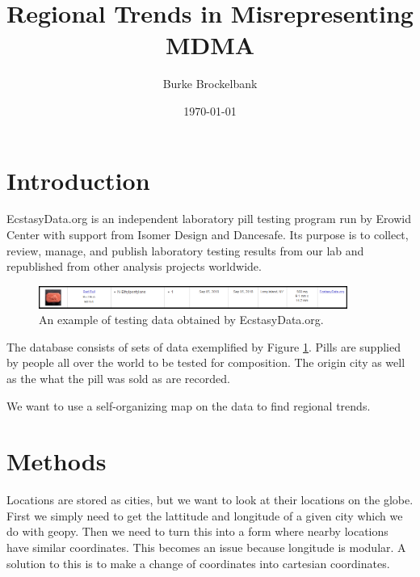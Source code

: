 \documentclass[%
 reprint,
nofootinbib,
 amsmath,amssymb,
 aps,
]{revtex4-1}
\begin{document}

\title{Regional Trends in Misrepresenting MDMA}%

\author{Burke Brockelbank}

\date{\today}%

\begin{abstract}

\end{abstract}

\maketitle

\section{\label{sec:Introduction}Introduction}
EcstasyData.org is an independent laboratory pill testing program run by Erowid Center with support from Isomer Design and Dancesafe. Its purpose is to collect, review, manage, and publish laboratory testing results from our lab and republished from other analysis projects worldwide.

\begin{figure}
  \includegraphics[width=0.9\textwidth]{example.png}
  \caption{An example of testing data obtained by EcstasyData.org. } \label{fig:DataExample}
\end{figure}

The database consists of sets of data exemplified by Figure \ref{fig:DataExample}. Pills are supplied by people all over the world to be tested for composition. The origin city as well as the what the pill was sold as are recorded.

We want to use a self-organizing map on the data to find regional trends.

\section{\label{sec:Methods}Methods}

	Locations are stored as cities, but we want to look at their locations on the globe. First we simply need to get the lattitude and longitude of a given city which we do with geopy. Then we need to turn this into a form where nearby locations have similar coordinates. This becomes an issue because longitude is modular. A solution to this is to make a change of coordinates into cartesian coordinates.
\end{document}
